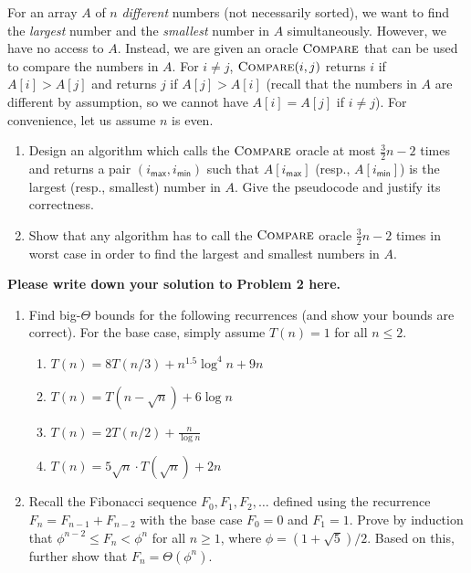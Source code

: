 \documentclass[letterpaper, 11pt]{article}
\newcommand{\1}{\mathds{1}}	%
\theoremstyle{definition}
\begin{document}
For an array $A$ of $n$ \textit{different} numbers (not necessarily sorted), we want to find the \textit{largest} number and the \textit{smallest} number in $A$ simultaneously.
However, we have no access to $A$.
Instead, we are given an oracle $\textsc{Compare}$ that can be used to compare the numbers in $A$.
For $i \neq j$, $\textsc{Compare}(i,j)$ returns $i$ if $A[i]>A[j]$ and returns $j$ if $A[j]>A[i]$ (recall that the numbers in $A$ are different by assumption, so we cannot have $A[i]=A[j]$ if $i \neq j$).
For convenience, let us assume $n$ is even.
\begin{enumerate}
    \item Design an algorithm which calls the $\textsc{Compare}$ oracle at most $\frac{3}{2} n - 2$ times and returns a pair $(i_\mathsf{max},i_\mathsf{min})$ such that $A[i_\mathsf{max}]$ (resp., $A[i_\mathsf{min}]$) is the largest (resp., smallest) number in $A$. Give the pseudocode and justify its correctness.
    \item[(b)$^\star$] Show that any algorithm has to call the $\textsc{Compare}$ oracle $\frac{3}{2} n - 2$ times in worst case in order to find the largest and smallest numbers in $A$.
\end{enumerate}

\begin{solution}
\textbf{Please write down your solution to Problem 2 here.}
\end{solution}

\begin{enumerate}
    \item Find big-$\Theta$ bounds for the following recurrences (and show your bounds are correct). For the base case, simply assume $T(n) = 1$ for all $n \leq 2$.
    \begin{enumerate}
        \item $T(n)=8T(n/3)+n^{1.5} \log^4 n + 9n$
        \item $T(n)=T(n-\sqrt{n}) + 6 \log n$
        \item $T(n)=2T(n/2)+ \frac{n}{\log n}$
        \item $T(n)= 5\sqrt{n} \cdot T(\sqrt{n}) + 2n$
    \end{enumerate}
    \item Recall the Fibonacci sequence $F_0,F_1,F_2,\dots$ defined using the recurrence $F_n = F_{n-1}+F_{n-2}$ with the base case $F_0 = 0$ and $F_1 = 1$. Prove by induction that $\phi^{n-2} \leq F_n < \phi^n$ for all $n \geq 1$, where $\phi = (1+\sqrt{5})/2$.
    Based on this, further show that $F_n = \Theta(\phi^n)$.
\end{enumerate}
\end{document}
